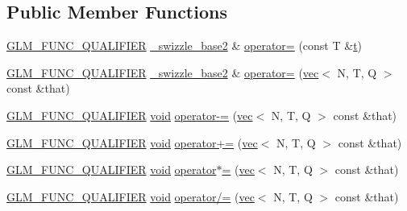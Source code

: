 \subsection*{Public Member Functions}
\begin{DoxyCompactItemize}
\item 
\hyperlink{setup_8hpp_a33fdea6f91c5f834105f7415e2a64407}{G\+L\+M\+\_\+\+F\+U\+N\+C\+\_\+\+Q\+U\+A\+L\+I\+F\+I\+ER} \hyperlink{structglm_1_1detail_1_1__swizzle__base2}{\+\_\+swizzle\+\_\+base2} \& \hyperlink{structglm_1_1detail_1_1__swizzle__base2_a48c3cc524e3e408243a1ee4ef42cd90c}{operator=} (const T \&\hyperlink{_s_d_l__opengl_8h_a7d65d00ca3b0630d9b5c52df855b19f5}{t})
\item 
\hyperlink{setup_8hpp_a33fdea6f91c5f834105f7415e2a64407}{G\+L\+M\+\_\+\+F\+U\+N\+C\+\_\+\+Q\+U\+A\+L\+I\+F\+I\+ER} \hyperlink{structglm_1_1detail_1_1__swizzle__base2}{\+\_\+swizzle\+\_\+base2} \& \hyperlink{structglm_1_1detail_1_1__swizzle__base2_a70f9bb1c990a71a55d125abc36c6849b}{operator=} (\hyperlink{structglm_1_1vec}{vec}$<$ N, T, Q $>$ const \&that)
\item 
\hyperlink{setup_8hpp_a33fdea6f91c5f834105f7415e2a64407}{G\+L\+M\+\_\+\+F\+U\+N\+C\+\_\+\+Q\+U\+A\+L\+I\+F\+I\+ER} \hyperlink{_s_d_l__opengles2__gl2ext_8h_ae5d8fa23ad07c48bb609509eae494c95}{void} \hyperlink{structglm_1_1detail_1_1__swizzle__base2_a5e985ec8cbfa38395aa667eea74d2ca0}{operator-\/=} (\hyperlink{structglm_1_1vec}{vec}$<$ N, T, Q $>$ const \&that)
\item 
\hyperlink{setup_8hpp_a33fdea6f91c5f834105f7415e2a64407}{G\+L\+M\+\_\+\+F\+U\+N\+C\+\_\+\+Q\+U\+A\+L\+I\+F\+I\+ER} \hyperlink{_s_d_l__opengles2__gl2ext_8h_ae5d8fa23ad07c48bb609509eae494c95}{void} \hyperlink{structglm_1_1detail_1_1__swizzle__base2_a4c22bf1dde634b274789b630f75af0f1}{operator+=} (\hyperlink{structglm_1_1vec}{vec}$<$ N, T, Q $>$ const \&that)
\item 
\hyperlink{setup_8hpp_a33fdea6f91c5f834105f7415e2a64407}{G\+L\+M\+\_\+\+F\+U\+N\+C\+\_\+\+Q\+U\+A\+L\+I\+F\+I\+ER} \hyperlink{_s_d_l__opengles2__gl2ext_8h_ae5d8fa23ad07c48bb609509eae494c95}{void} \hyperlink{structglm_1_1detail_1_1__swizzle__base2_a41a9fe45545f5adcd0c529c3a426e29f}{operator$\ast$=} (\hyperlink{structglm_1_1vec}{vec}$<$ N, T, Q $>$ const \&that)
\item 
\hyperlink{setup_8hpp_a33fdea6f91c5f834105f7415e2a64407}{G\+L\+M\+\_\+\+F\+U\+N\+C\+\_\+\+Q\+U\+A\+L\+I\+F\+I\+ER} \hyperlink{_s_d_l__opengles2__gl2ext_8h_ae5d8fa23ad07c48bb609509eae494c95}{void} \hyperlink{structglm_1_1detail_1_1__swizzle__base2_ad4ef23a8bcf9b2474f08c5f1960e3fbd}{operator/=} (\hyperlink{structglm_1_1vec}{vec}$<$ N, T, Q $>$ const \&that)

\end{DoxyCompactItemize}
